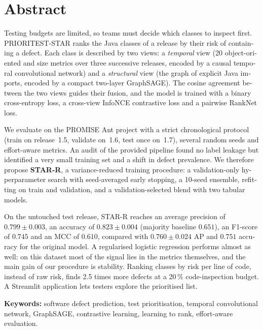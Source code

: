 \documentclass[11pt,a4paper,openany]{report}
\begin{document}
\chapter*{Abstract}
\begin{otherlanguage}{english}
Testing budgets are limited, so teams must decide which classes to inspect first.
PRIORITEST-STAR ranks the Java classes of a release by their risk of containing a defect.
Each class is described by two views: a \emph{temporal} view (20 object-oriented and size metrics over three
successive releases, encoded by a causal temporal convolutional network) and a \emph{structural} view
(the graph of explicit Java imports, encoded by a compact two-layer GraphSAGE).
The cosine agreement between the two views guides their fusion, and the model is trained with a binary
cross-entropy loss, a cross-view InfoNCE contrastive loss and a pairwise RankNet loss.

We evaluate on the PROMISE Ant project with a strict chronological protocol (train on release~1.5, validate on~1.6,
test once on~1.7), several random seeds and effort-aware metrics. An audit of the provided pipeline found no label
leakage but identified a very small training set and a shift in defect prevalence. We therefore propose
\textbf{STAR-R}, a variance-reduced training procedure: a validation-only hyperparameter search with seed-averaged
early stopping, a 10-seed ensemble, refitting on train and validation, and a validation-selected blend with two
tabular models.

On the untouched test release, STAR-R reaches an average precision of $0.799\pm0.003$, an accuracy of
$0.823\pm0.004$ (majority baseline $0.651$), an F1-score of $0.745$ and an MCC of $0.610$, compared with
$0.760\pm0.024$ AP and $0.751$ accuracy for the original model. A regularised logistic regression performs almost as
well: on this dataset most of the signal lies in the metrics themselves, and the main gain of our procedure is
stability. Ranking classes by risk per line of code, instead of raw risk, finds 2.5 times more defects at a 20\,\%
code-inspection budget. A Streamlit application lets testers explore the prioritised list.

\medskip\noindent\textbf{Keywords:} software defect prediction, test prioritisation, temporal convolutional network,
GraphSAGE, contrastive learning, learning to rank, effort-aware evaluation.
\end{otherlanguage}
\end{document}
